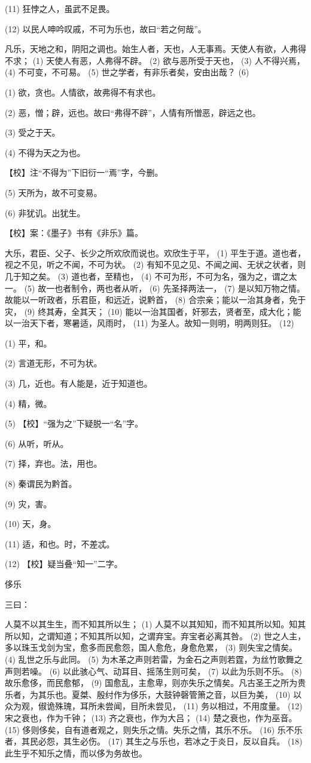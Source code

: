 \documentclass[12pt,UTF8]{ctexbook}
\begin{document}
(11) 狂悖之人，虽武不足畏。

(12) 以民人呻吟叹戚，不可为乐也，故曰“若之何哉”。

凡乐，天地之和，阴阳之调也。始生人者，天也，人无事焉。天使人有欲，人弗得不求； (1) 天使人有恶，人弗得不辟。 (2) 欲与恶所受于天也， (3) 人不得兴焉， (4) 不可变，不可易。 (5) 世之学者，有非乐者矣，安由出哉？ (6)

(1) 欲，贪也。人情欲，故弗得不有求也。

(2) 恶，憎；辟，远也。故曰“弗得不辟”，人情有所憎恶，辟远之也。

(3) 受之于天。

(4) 不得为天之为也。

【校】注“不得为”下旧衍一“焉”字，今删。

(5) 天所为，故不可变易。

(6) 非犹讥。出犹生。

【校】案：《墨子》书有《非乐》篇。

大乐，君臣、父子、长少之所欢欣而说也。欢欣生于平， (1) 平生于道。道也者，视之不见，听之不闻，不可为状。 (2) 有知不见之见、不闻之闻、无状之状者，则几于知之矣。 (3) 道也者，至精也， (4) 不可为形，不可为名，强为之，谓之太一。 (5) 故一也者制令，两也者从听， (6) 先圣择两法一， (7) 是以知万物之情。故能以一听政者，乐君臣，和远近，说黔首， (8) 合宗亲；能以一治其身者，免于灾， (9) 终其寿，全其天； (10) 能以一治其国者，奸邪去，贤者至，成大化；能以一治天下者，寒暑适，风雨时， (11) 为圣人。故知一则明，明两则狂。 (12)

(1) 平，和。

(2) 言道无形，不可为状。

(3) 几，近也。有人能是，近于知道也。

(4) 精，微。

(5) 【校】“强为之”下疑脱一“名”字。

(6) 从听，听从。

(7) 择，弃也。法，用也。

(8) 秦谓民为黔首。

(9) 灾，害。

(10) 天，身。

(11) 适，和也。时，不差忒。

(12) 【校】疑当叠“知一”二字。





侈乐


三曰：

人莫不以其生生，而不知其所以生； (1) 人莫不以其知知，而不知其所以知。知其所以知，之谓知道；不知其所以知，之谓弃宝。弃宝者必离其咎。 (2) 世之人主，多以珠玉戈剑为宝，愈多而民愈怨，国人愈危，身愈危累， (3) 则失宝之情矣。 (4) 乱世之乐与此同。 (5) 为木革之声则若雷，为金石之声则若霆，为丝竹歌舞之声则若噪。 (6) 以此骇心气、动耳目、摇荡生则可矣， (7) 以此为乐则不乐。 (8) 故乐愈侈，而民愈郁， (9) 国愈乱，主愈卑，则亦失乐之情矣。凡古圣王之所为贵乐者，为其乐也。夏桀、殷纣作为侈乐，大鼓钟磬管箫之音，以巨为美， (10) 以众为观，俶诡殊瑰，耳所未尝闻，目所未尝见， (11) 务以相过，不用度量。 (12) 宋之衰也，作为千钟； (13) 齐之衰也，作为大吕； (14) 楚之衰也，作为巫音。 (15) 侈则侈矣，自有道者观之，则失乐之情。失乐之情，其乐不乐。 (16) 乐不乐者，其民必怨，其生必伤。 (17) 其生之与乐也，若冰之于炎日，反以自兵。 (18) 此生乎不知乐之情，而以侈为务故也。
\end{document}
